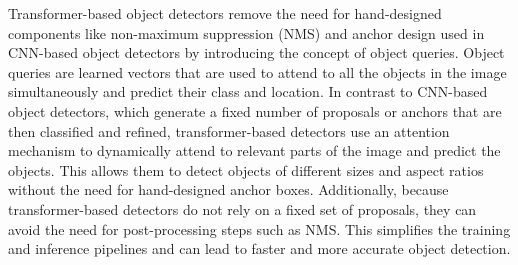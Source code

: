 \documentclass[sn-mathphys]{sn-jnl}\jyear{2021}\theoremstyle{thmstyleone}\newtheorem{theorem}{Theorem}\newtheorem{proposition}[theorem]{Proposition}\theoremstyle{thmstyletwo}\newtheorem{example}{Example}\newtheorem{remark}{Remark}\theoremstyle{thmstylethree}\newtheorem{definition}{Definition}\usepackage{amsmath}
\begin{document}
Transformer-based object detectors \cite{shehzadi2dreview} remove the need for hand-designed components like non-maximum suppression (NMS) and anchor design used in CNN-based object detectors by introducing the concept of object queries. Object queries are learned vectors that are used to attend to all the objects in the image simultaneously and predict their class and location.
In contrast to CNN-based object detectors, which generate a fixed number of proposals or anchors that are then classified and refined, transformer-based detectors use an attention mechanism to dynamically attend to relevant parts of the image and predict the objects. This allows them to detect objects of different sizes and aspect ratios without the need for hand-designed anchor boxes.
Additionally, because transformer-based detectors do not rely on a fixed set of proposals, they can avoid the need for post-processing steps such as NMS. This simplifies the training and inference pipelines and can lead to faster and more accurate object detection.
\end{document}
